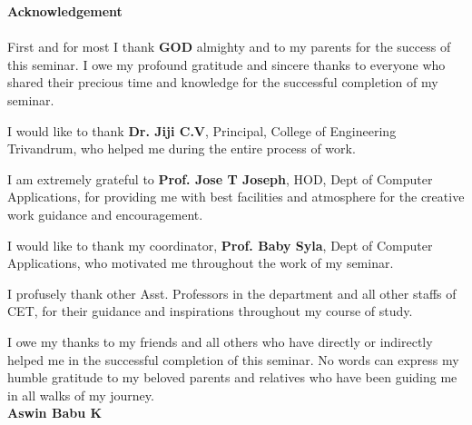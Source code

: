 \begin{titlepage}
\begin{center}
\textbf{\LARGE{Acknowledgement}}\\[0.5cm] 
\end{center}
\paragraph{}
First and for most I thank \textbf{GOD} almighty and to my parents for the
success of this seminar. I owe my profound gratitude and sincere thanks to
everyone who shared their precious time and knowledge for the successful
completion of my seminar.

I would like to thank \textbf{Dr. Jiji C.V}, Principal,  College of Engineering
Trivandrum, who helped me during the entire process of work.

I am extremely grateful to \textbf{Prof. Jose T Joseph}, HOD, Dept of Computer
Applications, for providing me with best facilities and atmosphere for the
creative work guidance and encouragement.

I would like to thank my coordinator,\textbf{ Prof. Baby Syla}, Dept of Computer
Applications, who motivated me throughout the work of my seminar.  

I profusely thank other Asst. Professors in the department and all other staffs
of CET, for their guidance and inspirations throughout my course of study.

I owe my thanks to my friends and all others who have directly or indirectly
helped me in the successful completion of this seminar. No words can express my
humble gratitude to my beloved parents and relatives who have been guiding me
in all walks of my journey.\\

\vspace{1.1cm}
\hspace{345pt} \textbf{Aswin Babu K}

\end{titlepage}
